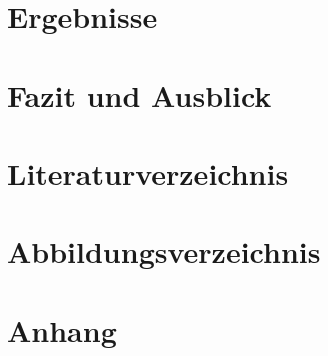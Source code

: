 \documentclass[a4paper, portrait, 12pt]{scrartcl} %
\begin{document}
\pagebreak


\pagebreak

\section{Ergebnisse}

\pagebreak

\section{Fazit und Ausblick}

\pagebreak

\section{Literaturverzeichnis}
\printbibliography
\pagebreak

\section{Abbildungsverzeichnis}
\listoffigures
\pagebreak




\appendix
\section{Anhang}
\label{sec:appendix_a}

  
\end{document}
